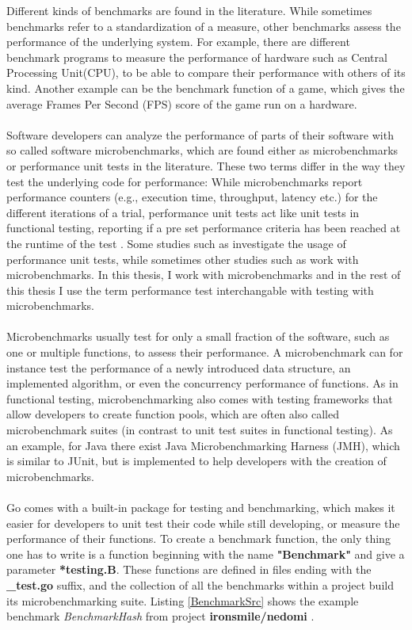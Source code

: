 \documentclass{seal_thesis}
\begin{document}
Different kinds of benchmarks are found in the literature. While sometimes benchmarks refer to a standardization of a measure, other benchmarks assess the performance of the underlying system. For example, there are different benchmark programs to measure the performance of hardware such as Central Processing Unit(CPU), to be able to compare their performance with others of its kind. Another example can be the benchmark function of a game, which gives the average Frames Per Second (FPS) score of the game run on a hardware.\\
\\
Software developers can analyze the performance of parts of their software with so called software microbenchmarks, which are found either as microbenchmarks or performance unit tests in the literature\cite{costa2019}. These two terms differ in the way they test the underlying code for performance: While microbenchmarks report performance counters (e.g., execution time, throughput, latency etc.) for the different iterations of a trial, performance unit tests act like unit tests in functional testing, reporting if a pre set performance criteria has been reached at the runtime of the test \cite{costa2019}. Some studies such as \cite{Stefan:2017:UTP:3030207.3030226}\cite{Horky:2015:UPU:2668930.2688051} investigate the usage of performance unit tests, while sometimes other studies such as \cite{Laaber:2018:EOS:3196398.3196407}\cite{rodriguez2016automatic} work with microbenchmarks. In this thesis, I work with microbenchmarks and in the rest of this thesis I use the term performance test interchangable with testing with microbenchmarks.\\
\\
Microbenchmarks usually test for only a small fraction of the software, such as one or multiple functions, to assess their performance. A microbenchmark can for instance test the performance of a newly introduced data structure, an implemented algorithm, or even the concurrency performance of functions\cite{costa2019}. As in functional testing, microbenchmarking also comes with testing frameworks that allow developers to create function pools, which are often also called microbenchmark suites (in contrast to unit test suites in functional testing). As an example, for Java there exist Java Microbenchmarking Harness (JMH), which is similar to JUnit, but is implemented to help developers with the creation of microbenchmarks\cite{JMH}.\\
\\
Go comes with a built-in package for testing and benchmarking, which makes it easier for developers to unit test their code while still developing, or measure the performance of their functions\cite{gobench}. To create a benchmark function, the only thing one has to write is a function beginning with the name \textbf{"Benchmark"} and give a parameter \textbf{*testing.B}. These functions are defined in files ending with the \textbf{\_test.go} suffix, and the collection of all the benchmarks within a project build its microbenchmarking suite. Listing \ref{BenchmarkSrc} shows the example benchmark \textit{BenchmarkHash} from project \textbf{ironsmile/nedomi} \cite{ironsmile/nedomi}.
\end{document}
